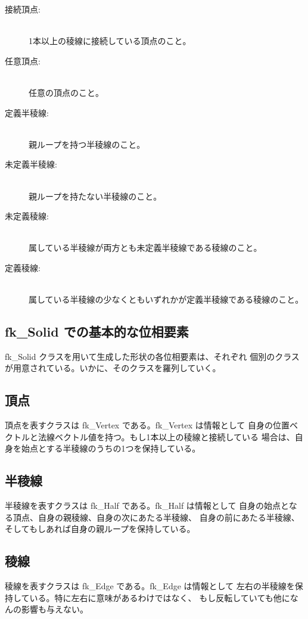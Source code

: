 \begin{description}
 \item[接続頂点:] ~ \\
	1本以上の稜線に接続している頂点のこと。

 \item[任意頂点:] ~ \\
	任意の頂点のこと。

 \item[定義半稜線:] ~ \\
	親ループを持つ半稜線のこと。

 \item[未定義半稜線:] ~ \\
	親ループを持たない半稜線のこと。

 \item[未定義稜線:] ~ \\
	属している半稜線が両方とも未定義半稜線である稜線のこと。

 \item[定義稜線:] ~ \\
	属している半稜線の少なくともいずれかが定義半稜線である稜線のこと。
\end{description}
\subsection{fk\_Solid での基本的な位相要素}
fk\_Solid クラスを用いて生成した形状の各位相要素は、それぞれ
個別のクラスが用意されている。いかに、そのクラスを羅列していく。

\subsection{頂点}
頂点を表すクラスは fk\_Vertex である。fk\_Vertex は情報として
自身の位置ベクトルと法線ベクトル値を持つ。もし1本以上の稜線と接続している
場合は、自身を始点とする半稜線のうちの1つを保持している。

\subsection{半稜線}
半稜線を表すクラスは fk\_Half である。fk\_Half は情報として
自身の始点となる頂点、自身の親稜線、自身の次にあたる半稜線、
自身の前にあたる半稜線、そしてもしあれば自身の親ループを保持している。

\subsection{稜線}
稜線を表すクラスは fk\_Edge である。fk\_Edge は情報として
左右の半稜線を保持している。特に左右に意味があるわけではなく、
もし反転していても他になんの影響も与えない。

